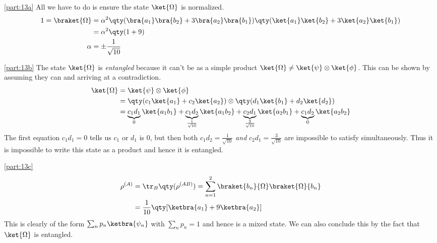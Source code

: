 \documentclass[boxes,pages]{homework}
\makeatletter
\numberwithin{@problem}{section}
\makeatother
\begin{document}
\begin{solution}
	\ref{part:13a}
	All we have to do is ensure the state $\ket{\Omega}$ is normalized.
	\begin{align*}
		1 = \braket{\Omega} & = \alpha^2\qty(\bra{a_1}\bra{b_2} + 3\bra{a_2}\bra{b_1})\qty(\ket{a_1}\ket{b_2} + 3\ket{a_2}\ket{b_1}) \\
		                    & = \alpha^2\qty(1 + 9)                                                                                  \\
		\alpha              & = \pm\frac{1}{\sqrt{10}}
	\end{align*}

	\ref{part:13b}
	The state $\ket{\Omega}$ is \emph{entangled} because it can't be as a simple product $\ket{\Omega} \neq \ket{\psi}\otimes \ket{\phi}$. This can be shown by assuming they can and arriving at a contradiction.
	\begin{align*}
		\ket{\Omega} & = \ket{\psi}\otimes \ket{\phi}                                                                                                                                                          \\
		             & = \qty(c_1\ket{a_1} + c_2\ket{a_2})\otimes\qty(d_1\ket{b_1} + d_2\ket{d_2})                                                                                                             \\
		             & = \underbrace{c_1d_1}_0\ket{a_1b_1} + \underbrace{c_1d_2}_{\frac{1}{\sqrt{10}}}\ket{a_1b_2} + \underbrace{c_2d_1}_{\frac{3}{\sqrt{10}}}\ket{a_2b_1} + \underbrace{c_1d_2}_0\ket{a_2b_2}
	\end{align*}
	The first equation $c_1d_1 = 0$ tells us $c_1$ or $d_1$ is 0, but then both $c_1d_2 = \frac{1}{\sqrt{10}}$ \emph{and} $c_2d_1 = \frac{3}{\sqrt{10}}$ are impossible to satisfy simultaneously. Thus it is impossible to write this state as a product and hence it is entangled.

	\ref{part:13c}
	\begin{align*}
		\rho^{(A)} & = \tr_B\qty(\rho^{(AB)}) = \sum_{n = 1}^2\braket{b_n}{\Omega}\braket{\Omega}{b_n} \\
		           & = \frac{1}{10}\qty[\ketbra{a_1} + 9\ketbra{a_2}]
	\end{align*}
	This is clearly of the form $\sum_np_n\ketbra{\psi_n}$ with $\sum_np_n = 1$ and hence is a mixed state. We can also conclude this by the fact that $\ket{\Omega}$ is entangled.
\end{solution}
\end{document}
